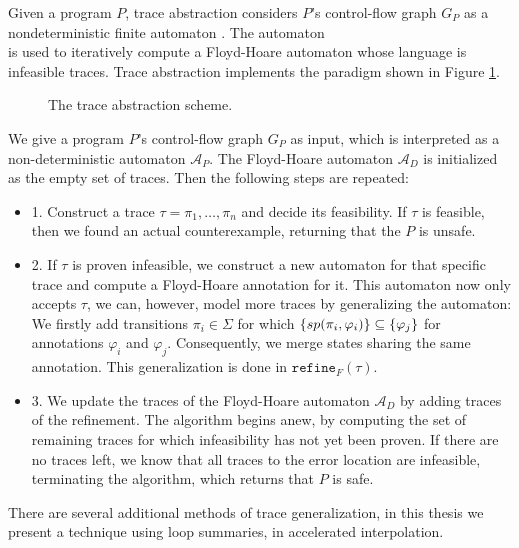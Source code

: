 Given a program $P$, trace abstraction considers $P$'s control-flow graph $G_P$ as a nondeterministic finite automaton . The automaton \\  is used to iteratively compute a Floyd-Hoare automaton  whose language is infeasible traces. Trace abstraction implements the paradigm shown in Figure \ref{traceAbstractionScheme}.

\begin{figure}[H]
	\centering
	
	\caption{The trace abstraction scheme.}
	\label{traceAbstractionScheme}
\end{figure}

We give a program $P$'s control-flow graph $G_P$  as input, which is interpreted as a non-deterministic automaton $\mathcal{A}_P$. The Floyd-Hoare automaton $\mathcal{A}_D$ is initialized as the empty set of traces. Then the following steps are repeated: 
\begin{itemize}
	\item 1. Construct a trace $\tau = \pi_1, \ldots, \pi_n$ and decide its feasibility. If $\tau$ is feasible, then we found an actual counterexample, returning that the $P$ is unsafe.
	\item 2. If $\tau$ is proven infeasible, we construct a new automaton for that specific trace and compute a Floyd-Hoare annotation for it. This automaton now only accepts $\tau$, we can, however, model more traces by generalizing the automaton: We firstly add transitions $\pi_i \in \Sigma$ for which $\{sp(\pi_i, \varphi_i)\} \subseteq \{\varphi_j\}$ for annotations $\varphi_i$ and $\varphi_j$. Consequently, we merge states sharing the same annotation. This generalization is done in $\texttt{refine}_F(\tau)$.
	\item 3. We update the traces of the Floyd-Hoare automaton $\mathcal{A}_D$ by adding traces of the refinement. The algorithm begins anew, by computing the set of remaining traces for which infeasibility has not yet been proven. If there are no traces left, we know that all traces to the error location are infeasible, terminating the algorithm, which returns that $P$ is safe.
\end{itemize}
There are several additional methods of trace generalization, in this thesis we present a technique using loop summaries, in accelerated interpolation. \\ \par

